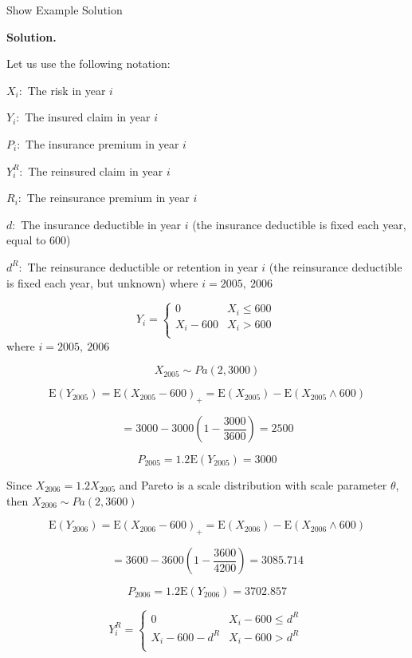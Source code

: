 \documentclass[]{book}
\theoremstyle{definition}
\theoremstyle{definition}
\theoremstyle{definition}
\theoremstyle{remark}
\begin{document}
Show Example Solution

\hypertarget{toggleExampleLoss.4.6}{}
\textbf{Solution.}

Let us use the following notation:

\(X_{i}:\) The risk in year \(i\)

\(Y_{i}:\) The insured claim in year \(i\)

\(P_{i}:\) The insurance premium in year \(i\)

\(Y_{i}^{R}:\) The reinsured claim in year \(i\)

\(R_{i}:\) The reinsurance premium in year \(i\)

\(d:\) The insurance deductible in year \(i\) (the insurance deductible
is fixed each year, equal to 600)

\(d^{R}:\) The reinsurance deductible or retention in year \(i\) (the
reinsurance deductible is fixed each year, but unknown) where
\(i = 2005,\ 2006\)

\[Y_{i} = \left\{ \begin{matrix}
0 & X_{i} \leq 600 \\
X_{i} - 600 & X_{i} > 600 \\
\end{matrix} \right.\ \] where \(i = 2005,\ 2006\)

\[X_{2005}\sim Pa\left( 2,3000 \right)\]

\[\mathrm{E}\left( Y_{2005} \right) = \mathrm{E}\left( X_{2005} - 600 \right)_{+} = \mathrm{E}\left( X_{2005} \right) - \mathrm{E}\left( X_{2005} \land 600 \right)\]

\[= 3000 - 3000\left( 1 - \frac{3000}{3600} \right) = 2500\]

\[P_{2005} = 1.2\mathrm{E}\left( Y_{2005} \right) = 3000\]

Since \(X_{2006} = 1.2X_{2005}\) and Pareto is a scale distribution with
scale parameter \(\theta\), then
\(X_{2006}\sim Pa\left( 2,3600 \right)\)

\[\mathrm{E}\left( Y_{2006} \right) = \mathrm{E}\left( X_{2006} - 600 \right)_{+} = \mathrm{E}\left( X_{2006} \right) - \mathrm{E}\left( X_{2006} \land 600 \right)\]

\[= 3600 - 3600\left( 1 - \frac{3600}{4200} \right) = 3085.714\]

\[P_{2006} = 1.2\mathrm{E}\left( Y_{2006} \right) = 3702.857\]

\[Y_{i}^{R} = \left\{ \begin{matrix}
0 & X_{i} - 600 \leq d^{R} \\
X_{i} - 600 - d^{R} & X_{i} - 600 > d^{R} \\
\end{matrix} \right.\ \]
\end{document}
